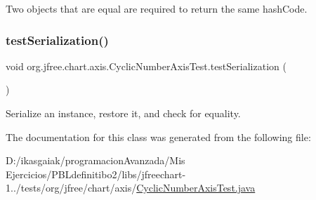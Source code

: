 Two objects that are equal are required to return the same hash\+Code. \mbox{\label{classorg_1_1jfree_1_1chart_1_1axis_1_1_cyclic_number_axis_test_ad94267b403194f1d0788bd208a051918}} 
\subsubsection{\texorpdfstring{test\+Serialization()}{testSerialization()}}
{\footnotesize\ttfamily void org.\+jfree.\+chart.\+axis.\+Cyclic\+Number\+Axis\+Test.\+test\+Serialization (\begin{DoxyParamCaption}{ }\end{DoxyParamCaption})}

Serialize an instance, restore it, and check for equality. 

The documentation for this class was generated from the following file\+:\begin{DoxyCompactItemize}
\item 
D\+:/ikasgaiak/programacion\+Avanzada/\+Mis Ejercicios/\+P\+B\+Ldefinitibo2/libs/jfreechart-\/1../tests/org/jfree/chart/axis/\mbox{\hyperlink{_cyclic_number_axis_test_8java}{Cyclic\+Number\+Axis\+Test.\+java}}\end{DoxyCompactItemize}
